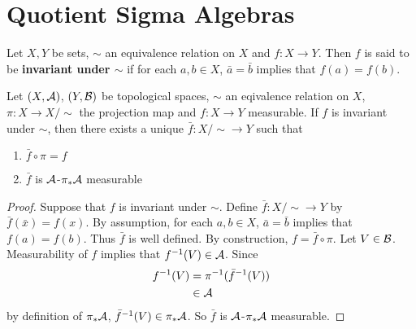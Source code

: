 \documentclass{book}
\begin{document}
	\section{Quotient Sigma Algebras}
	\begin{defn}
		Let $X,Y$ be sets, $\sim$ an equivalence relation on $X$ and $f: X \rightarrow Y$. Then $f$ is said to be \textbf{invariant under $\sim$} if for each $a,b \in X$, $\bar{a} = \bar{b}$ implies that $f(a) = f(b)$. 
	\end{defn}
	
	\begin{ex} \lex{}
		Let $(X, \mathcal{A})$, $(Y, \mathcal{B})$ be topological spaces, $\sim$ an eqivalence relation on $X$, $\pi:X \rightarrow X/\sim$ the projection map and $f:X \rightarrow Y$ measurable. If $f$ is invariant under $\sim$, then there exists a unique $\bar{f}:X / {\sim} \rightarrow Y$ such that 
		\begin{enumerate}
			\item $\bar{f} \circ \pi = f$
			\item $\bar{f}$ is $\mathcal{A}$-$\pi_*\mathcal{A}$ measurable 
		\end{enumerate}
	\end{ex}
	
	\begin{proof}
		Suppose that $f$ is invariant under $\sim$. Define $\bar{f}: X / {\sim} \rightarrow Y$ by $\bar{f}(\bar{x}) = f(x)$. By assumption, for each $a, b \in X$, $\bar{a} = \bar{b}$ implies that $f(a) = f(b)$. Thus $\bar{f}$ is well defined. By construction, $f = \bar{f} \circ \pi$. Let $V \in \mathcal{B}$. Measurability of $f$ implies that $f^{-1}(V) \in \mathcal{A}$. Since 
		\begin{align*}
			f^{-1}(V)
			&= \pi^{-1}(\bar{f}^{-1}(V)) \\
			& \in \mathcal{A}
		\end{align*}
		by definition of $\pi_*\mathcal{A}$, $\bar{f}^{-1}(V) \in \pi_*\mathcal{A}$. So $\bar{f}$ is $\mathcal{A}$-$\pi_*\mathcal{A}$ measurable.
	\end{proof}
\end{document}
